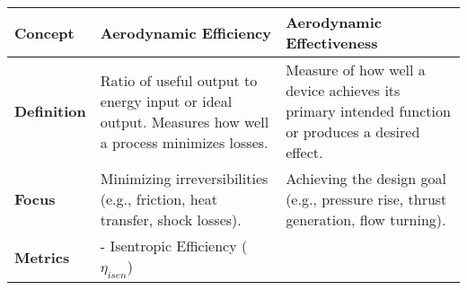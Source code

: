 \begin{longtable}[]{@{}lll@{}}
\toprule
\begin{minipage}[b]{0.15\columnwidth}\raggedright
Concept\strut
\end{minipage} & \begin{minipage}[b]{0.38\columnwidth}\raggedright
Aerodynamic Efficiency\strut
\end{minipage} & \begin{minipage}[b]{0.38\columnwidth}\raggedright
Aerodynamic Effectiveness\strut
\end{minipage}\tabularnewline
\midrule
\endhead
\begin{minipage}[t]{0.15\columnwidth}\raggedright
\textbf{Definition}\strut
\end{minipage} & \begin{minipage}[t]{0.38\columnwidth}\raggedright
Ratio of useful output to energy input or ideal output. Measures how
well a process minimizes losses.\strut
\end{minipage} & \begin{minipage}[t]{0.38\columnwidth}\raggedright
Measure of how well a device achieves its primary intended function or
produces a desired effect.\strut
\end{minipage}\tabularnewline
\begin{minipage}[t]{0.15\columnwidth}\raggedright
\textbf{Focus}\strut
\end{minipage} & \begin{minipage}[t]{0.38\columnwidth}\raggedright
Minimizing irreversibilities (e.g., friction, heat transfer, shock
losses).\strut
\end{minipage} & \begin{minipage}[t]{0.38\columnwidth}\raggedright
Achieving the design goal (e.g., pressure rise, thrust generation, flow
turning).\strut
\end{minipage}\tabularnewline
\begin{minipage}[t]{0.15\columnwidth}\raggedright
\textbf{Metrics}\strut
\end{minipage} & \begin{minipage}[t]{0.38\columnwidth}\raggedright
- Isentropic Efficiency (\(\eta_{isen}\))\strut
\end{minipage} & \begin{minipage}[t]{0.38\columnwidth}\raggedright
\strut
\end{minipage}\tabularnewline
\bottomrule
\end{longtable}

